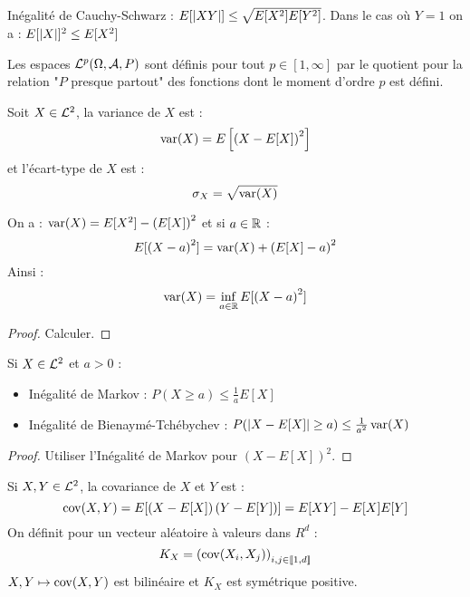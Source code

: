 \documentclass{cours}
\begin{document}
\begin{proposition}
    Inégalité de Cauchy-Schwarz : $E[\left|XY\right|] \leq \sqrt{E[X^{2}]E[Y^{2}]}$. Dans le cas où $Y = 1$ on a : $E[\left|X\right|]^{2} \leq E[X^{2}]$
\end{proposition}

Les espaces $\mathcal{L}^{p}(\Omega, \mathcal{A}, P)$ sont définis pour tout $p \in \left[1, \infty\right]$ par le quotient pour la relation "$P$ presque partout" des fonctions dont le moment d'ordre $p$ est défini.

\begin{definition}
    Soit $X \in \mathcal{L}^{2}$, la variance de $X$ est :
    \[
        \operatorname{var}(X) = E\left[\left(X - E[X]\right)^{2}\right]
    \]
    et l'écart-type de $X$ est :
    \[
        \sigma_{X} = \sqrt{\operatorname{var}(X)}
    \]
\end{definition}

\begin{proposition}
    On a : $\operatorname{var}(X) = E[X^{2}] - \left(E[X]\right)^{2}$ et si $a \in \mathbb{R}$ :
    \[
        E[\left(X - a\right)^{2}] = \operatorname{var}(X) + \left(E[X] - a\right)^{2}
    \]
    Ainsi :
    \[
        \operatorname{var}(X) = \inf_{a\in \mathbb{R}} E[\left(X - a\right)^{2}]
    \]
\end{proposition}
\begin{proof}
    Calculer.
\end{proof}


\begin{proposition}
    Si $X \in \mathcal{L}^{2}$ et $a > 0$ :
    \begin{itemize}
        \item Inégalité de Markov : $P(X \geq a) \leq \frac{1}{a}E[X]$
        \item Inégalité de Bienaymé-Tchébychev : $P(\left|X - E[X]\right| \geq a) \leq \frac{1}{a^{2}}\operatorname{var}(X)$
    \end{itemize}
\end{proposition}
\begin{proof}
    Utiliser l'Inégalité de Markov pour $\left(X - E[X]\right)^{2}$.
\end{proof}

\begin{definition}
    Si $X, Y \in \mathcal{L}^{2}$, la covariance de $X$ et $Y$ est :
    \[
        \operatorname{cov}(X, Y) = E[\left(X - E[X]\right)\left(Y - E[Y]\right)] = E[XY] - E[X]E[Y]
    \]
    On définit pour un vecteur aléatoire à valeurs dans $R^{d}$ :
    \[
        K_{X} = \left(\operatorname{cov}(X_{i}, X_{j})\right)_{i, j \in \llbracket 1,d\rrbracket}
    \]
    $X, Y \mapsto \operatorname{cov}(X, Y)$ est bilinéaire et $K_{X}$ est symétrique positive.
\end{definition}
\end{document}
